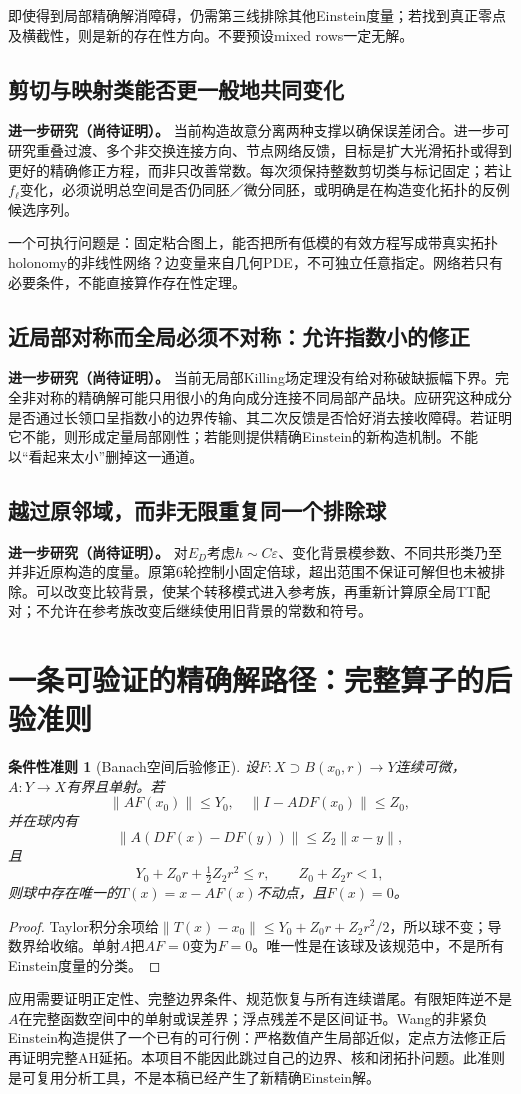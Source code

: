 \documentclass[UTF8,fontset=fandol,zihao=-4]{ctexart}
\theoremstyle{cn}
\newtheorem{criterion}[result]{条件性准则}
\newcommand{\newidea}{\par\noindent\textbf{进一步研究（尚待证明）。}}
\begin{document}
即使得到局部精确解消障碍，仍需第三线排除其他Einstein度量；若找到真正零点及横截性，则是新的存在性方向。不要预设mixed rows一定无解。

\subsection{剪切与映射类能否更一般地共同变化}
\newidea
当前构造故意分离两种支撑以确保误差闭合。进一步可研究重叠过渡、多个非交换连接方向、节点网络反馈，目标是扩大光滑拓扑或得到更好的精确修正方程，而非只改善常数。每次须保持整数剪切类与标记固定；若让$f_\ell$变化，必须说明总空间是否仍同胚／微分同胚，或明确是在构造变化拓扑的反例候选序列。

一个可执行问题是：固定粘合图上，能否把所有低模的有效方程写成带真实拓扑holonomy的非线性网络？边变量来自几何PDE，不可独立任意指定。网络若只有必要条件，不能直接算作存在性定理。

\subsection{近局部对称而全局必须不对称：允许指数小的修正}
\newidea
当前无局部Killing场定理没有给对称破缺振幅下界。完全非对称的精确解可能只用很小的角向成分连接不同局部产品块。应研究这种成分是否通过长领口呈指数小的边界传输、其二次反馈是否恰好消去接收障碍。若证明它不能，则形成定量局部刚性；若能则提供精确Einstein的新构造机制。不能以“看起来太小”删掉这一通道。

\subsection{越过原邻域，而非无限重复同一个排除球}
\newidea
对$E_D$考虑$h\sim C\varepsilon$、变化背景模参数、不同共形类乃至并非近原构造的度量。原第6轮控制小固定倍球，超出范围不保证可解但也未被排除。可以改变比较背景，使某个转移模式进入参考族，再重新计算原全局TT配对；不允许在参考族改变后继续使用旧背景的常数和符号。

\section{一条可验证的精确解路径：完整算子的后验准则}
\begin{criterion}[Banach空间后验修正]
设$F:X\supset B(x_0,r)\to Y$连续可微，$A:Y\to X$有界且单射。若
\[
 \|AF(x_0)\|\le Y_0,\quad
 \|I-ADF(x_0)\|\le Z_0,
\]
并在球内有
\[
 \|A(DF(x)-DF(y))\|\le Z_2\|x-y\|,
\]
且
\[
 Y_0+Z_0r+\tfrac12Z_2r^2\le r,
 \qquad Z_0+Z_2r<1,
\]
则球中存在唯一的$T(x)=x-AF(x)$不动点，且$F(x)=0$。
\end{criterion}
\begin{proof}
Taylor积分余项给$\|T(x)-x_0\|\le Y_0+Z_0r+Z_2r^2/2$，所以球不变；导数界给收缩。单射$A$把$AF=0$变为$F=0$。唯一性是在该球及该规范中，不是所有Einstein度量的分类。
\end{proof}
应用需要证明正定性、完整边界条件、规范恢复与所有连续谱尾。有限矩阵逆不是$A$在完整函数空间中的单射或误差界；浮点残差不是区间证书。Wang的非紧负Einstein构造提供了一个已有的可行例：严格数值产生局部近似，定点方法修正后再证明完整AH延拓\cite{Wang}。本项目不能因此跳过自己的边界、核和闭拓扑问题。此准则是可复用分析工具，不是本稿已经产生了新精确Einstein解。
\end{document}
